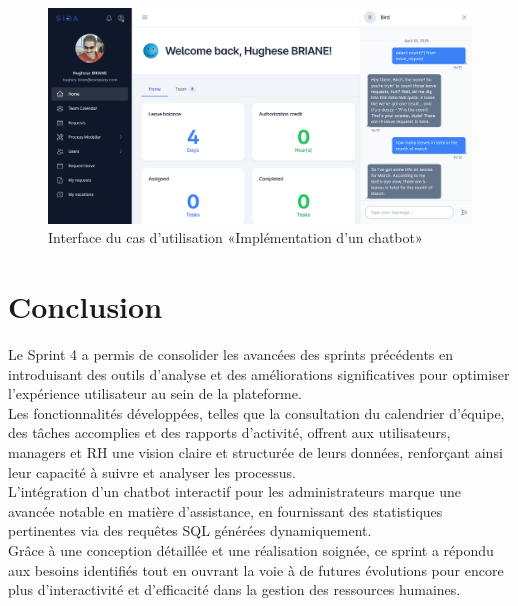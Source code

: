 \clearpage
\begin{figure}[h]
    \centering
    \includegraphics[width=16cm]{images/realisation/ollama3.png}
    \caption{Interface du cas d'utilisation «Implémentation d’un chatbot»}
    \label{fig:chatbot_interface2}
\end{figure}
\section{Conclusion}
Le Sprint 4 a permis de consolider les avancées des sprints précédents en introduisant des outils d’analyse et des améliorations significatives pour optimiser l’expérience utilisateur au sein de la plateforme.\\
Les fonctionnalités développées, telles que la consultation du calendrier d’équipe, des tâches accomplies et des rapports d’activité, offrent aux utilisateurs, managers et RH une vision claire et structurée de leurs données, renforçant ainsi leur capacité à suivre et analyser les processus.\\
L’intégration d’un chatbot interactif pour les administrateurs marque une avancée notable en matière d’assistance, en fournissant des statistiques pertinentes via des requêtes SQL générées dynamiquement.\\
Grâce à une conception détaillée et une réalisation soignée, ce sprint a répondu aux besoins identifiés tout en ouvrant la voie à de futures évolutions pour encore plus d’interactivité et d’efficacité dans la gestion des ressources humaines.